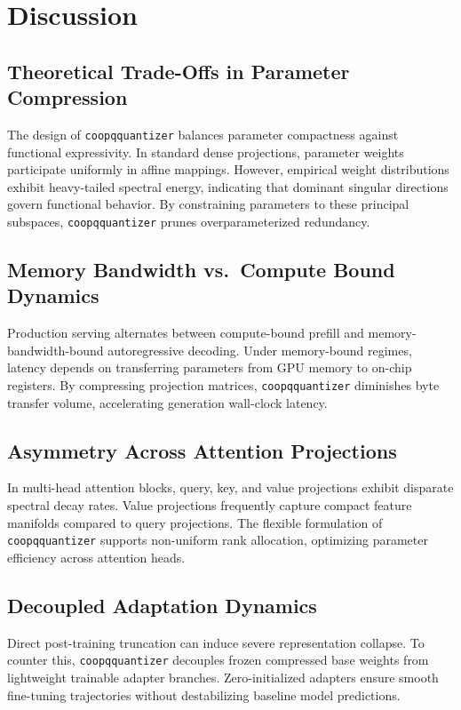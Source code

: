 \section{Discussion}

\subsection{Theoretical Trade-Offs in Parameter Compression}
The design of \texttt{coopqquantizer} balances parameter compactness against functional expressivity. In standard dense projections, parameter weights participate uniformly in affine mappings. However, empirical weight distributions exhibit heavy-tailed spectral energy, indicating that dominant singular directions govern functional behavior. By constraining parameters to these principal subspaces, \texttt{coopqquantizer} prunes overparameterized redundancy.

\subsection{Memory Bandwidth vs.\ Compute Bound Dynamics}
Production serving alternates between compute-bound prefill and memory-bandwidth-bound autoregressive decoding. Under memory-bound regimes, latency depends on transferring parameters from GPU memory to on-chip registers. By compressing projection matrices, \texttt{coopqquantizer} diminishes byte transfer volume, accelerating generation wall-clock latency.

\subsection{Asymmetry Across Attention Projections}
In multi-head attention blocks, query, key, and value projections exhibit disparate spectral decay rates. Value projections frequently capture compact feature manifolds compared to query projections. The flexible formulation of \texttt{coopqquantizer} supports non-uniform rank allocation, optimizing parameter efficiency across attention heads.

\subsection{Decoupled Adaptation Dynamics}
Direct post-training truncation can induce severe representation collapse. To counter this, \texttt{coopqquantizer} decouples frozen compressed base weights from lightweight trainable adapter branches. Zero-initialized adapters ensure smooth fine-tuning trajectories without destabilizing baseline model predictions.

